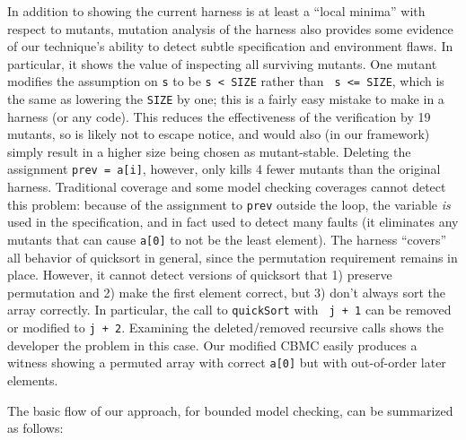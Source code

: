 \documentclass{svjour3}
\begin{document}
In addition to showing the current harness is at least a ``local
minima'' with respect to mutants, mutation analysis of the harness
also provides some evidence of our technique's ability to detect
subtle specification and environment flaws.  In particular, it shows
the value of inspecting all surviving mutants.  One mutant
modifies the assumption on {\tt s} to be {\tt s < SIZE} rather than {\tt
s <= SIZE}, which is the same as lowering the {\tt SIZE} by one; this
is a fairly easy mistake to make in a harness (or any code).  This reduces the
effectiveness of the verification by 19 mutants, so is likely not to
escape notice, and would also (in our framework) simply result in a
higher size being chosen as mutant-stable.  Deleting the assignment
{\tt prev = a[i]}, however, only kills 4 fewer mutants than the
original harness.  Traditional coverage and some model checking coverages
cannot detect this problem: because of the assignment to {\tt prev}
outside the loop, the variable \emph{is} used in the specification, and in
fact used to detect many faults (it eliminates any mutants that can
cause {\tt a[0]} to not be the least element).  The harness ``covers'' all behavior of quicksort in general, since
the permutation requirement remains in place.  However, it cannot
detect versions of quicksort that 1) preserve permutation and 2) make
the first element correct, but 3) don't always sort the
array correctly.  In particular, the call to {\tt quickSort} with {\tt
  j + 1} can be removed or modified to {\tt j + 2}.
Examining the deleted/removed recursive calls shows the developer
the problem in this case.  Our modified CBMC easily produces a witness showing a permuted array with correct
{\tt a[0]} but with out-of-order later elements.


The basic flow of our approach, for bounded model checking, can be
summarized as follows:
\end{document}

